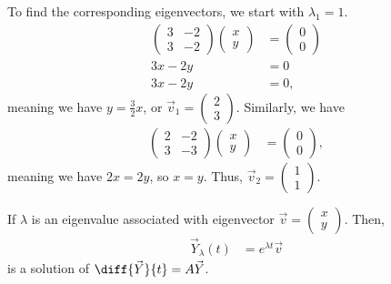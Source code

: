 \documentclass[10pt]{mypackage}
\begin{document}
\begin{example}
  To find the corresponding eigenvectors, we start with $\lambda_1 = 1$.
  \begin{align*}
    \begin{pmatrix}3 & -2 \\ 3 & -2\end{pmatrix} \begin{pmatrix}x\\y\end{pmatrix} &= \begin{pmatrix}0\\0\end{pmatrix}\\
    3x - 2y &= 0\\
    3x -2y &= 0,
  \end{align*}
  meaning we have $y = \frac{3}{2}x$, or $\vec{v}_1 = \begin{pmatrix}2\\3\end{pmatrix}$. Similarly, we have
  \begin{align*}
    \begin{pmatrix}2 & -2 \\ 3 & -3\end{pmatrix} \begin{pmatrix}x\\y\end{pmatrix} &= \begin{pmatrix}0\\0\end{pmatrix},
  \end{align*}
  meaning we have $2x = 2y$, so $x = y$. Thus, $\vec{v}_{2} = \begin{pmatrix}1\\1\end{pmatrix}$.
\begin{definition}
  If $\lambda$ is an eigenvalue associated with eigenvector $\vec{v} = \begin{pmatrix}x\\y\end{pmatrix}$. Then,
  \begin{align*}
    \vec{Y}_{\lambda}(t) &= e^{\lambda t}\vec{v}
  \end{align*}
  is a solution of $\diff{\vec{Y}}{t} = A\vec{Y}$.\newline


\end{definition}
\end{example}
\end{document}

